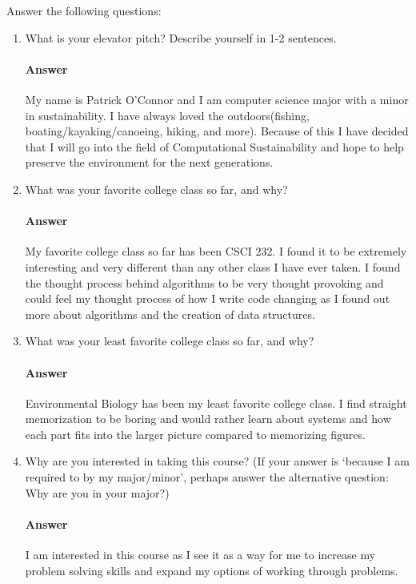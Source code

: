 \documentclass{article}
\begin{document}
Answer the following questions:
\begin{enumerate}
    \item What is your elevator pitch?  Describe yourself in 1-2
        sentences.
        \paragraph{Answer} My name is Patrick O'Connor and I am computer science major with a minor in sustainability. I have always loved the outdoors(fishing, boating/kayaking/canoeing, hiking, and more). Because of this I have decided that I will go into the field of Computational Sustainability and hope to help preserve the environment for the next generations. 

    \item What was your favorite college class so far, and why?
        \paragraph{Answer} My favorite college class so far has been CSCI 232. I found it to be extremely interesting and very different than any other class I have ever taken. I found the thought process behind algorithms to be very thought provoking and could feel my thought process of how I write code changing as I found out more about algorithms and the creation of data structures. 

    \item What was your least favorite college class so far, and why?
        \paragraph{Answer} Environmental Biology has been my least favorite college class. I find straight memorization to be boring and would rather learn about systems and how each part fits into the larger picture compared to memorizing figures.

    \item Why are you interested in taking this course? (If your answer is
        `because I am required to by my major/minor', perhaps answer the
        alternative question: Why are you in your major?)
        \paragraph{Answer} I am interested in this course as I see it as a way for me to increase my problem solving skills and expand my options of working through problems.


\end{enumerate}
\end{document}
